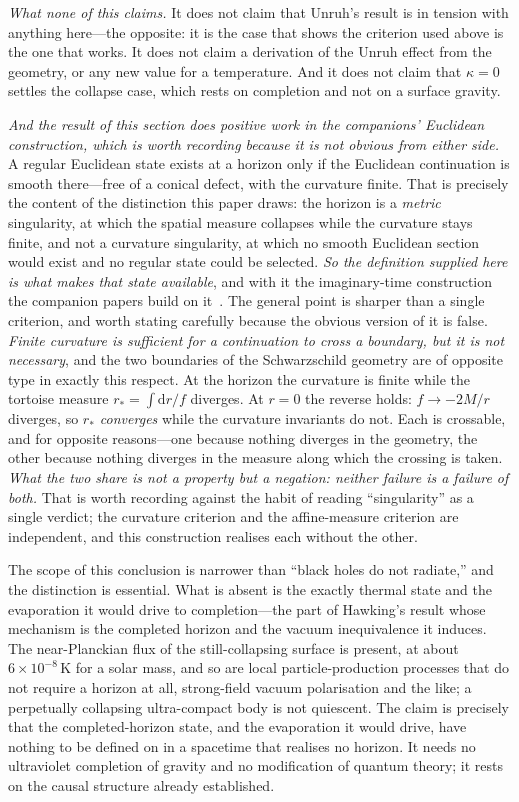\documentclass[11pt,a4paper]{article}
\theoremstyle{plain}
\theoremstyle{remark}
\newcommand{\dd}{\mathrm{d}}
\begin{document}
\emph{What none of this claims.} It does not claim that Unruh's result is in tension with anything here---the
opposite: it is the case that shows the criterion used above is the one that works. It does not claim a
derivation of the Unruh effect from the geometry, or any new value for a temperature. And it does not claim
that $\kappa=0$ settles the collapse case, which rests on completion and not on a surface gravity.

\emph{And the result of this section does positive work in the companions' Euclidean construction, which is worth
recording because it is not obvious from either side.} A regular Euclidean state exists at a horizon only if the Euclidean
continuation is smooth there---free of a conical defect, with the curvature finite. That is precisely the
content of the distinction this paper draws: the horizon is a \emph{metric} singularity, at which the spatial
measure collapses while the curvature stays finite, and not a curvature singularity, at which no smooth
Euclidean section would exist and no regular state could be selected. \emph{So the definition supplied here is
what makes that state available}, and with it the imaginary-time construction the companion papers build on
it~\cite{JanzenCRframework, JanzenCanonicalTime}. The general point is sharper than a single criterion, and
worth stating carefully because the obvious version of it is false. \emph{Finite curvature is sufficient for a
continuation to cross a boundary, but it is not necessary}, and the two boundaries of the Schwarzschild
geometry are of opposite type in exactly this respect. At the horizon the curvature is finite while the
tortoise measure $r_{*}=\int\dd r/f$ diverges. At $r=0$ the reverse holds: $f\to-2M/r$ diverges, so
\emph{$r_{*}$ converges} while the curvature invariants do not. Each is crossable, and for opposite reasons---one
because nothing diverges in the geometry, the other because nothing diverges in the measure along which the
crossing is taken. \emph{What the two share is not a property but a negation: neither failure is a failure of
both.} That is worth recording against the habit of reading ``singularity'' as a single verdict; the curvature
criterion and the affine-measure criterion are independent, and this construction realises each without the
other.

The scope of this conclusion is narrower than ``black holes do not radiate,'' and the distinction is essential. What is absent is the exactly thermal state and the evaporation it would drive to completion---the part of Hawking's result whose mechanism is the completed horizon and the vacuum inequivalence it induces. The near-Planckian flux of the still-collapsing surface is present, at about $6\times10^{-8}$\,K for a solar mass, and so are local particle-production processes that do not require a horizon at all, strong-field vacuum polarisation and the like; a perpetually collapsing ultra-compact body is not quiescent. The claim is precisely that the completed-horizon state, and the evaporation it would drive, have nothing to be defined on in a spacetime that realises no horizon. It needs no ultraviolet completion of gravity and no modification of quantum theory; it rests on the causal structure already established.
\end{document}
